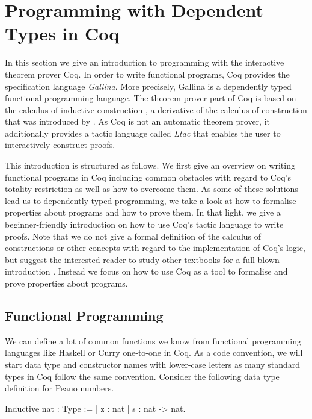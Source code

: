 \section{Programming with Dependent Types in Coq}
\label{sec:progDT}

In this section we give an introduction to programming with the interactive theorem prover Coq.
In order to write functional programs, Coq provides the specification language \emph{Gallina}.
More precisely, Gallina is a dependently typed functional programming language.
The theorem prover part of Coq is based on the calculus of inductive construction \citep{coquand1988inductively}, a derivative of the calculus of construction that was introduced by \citet{coquand1986calculus}.
As Coq is not an automatic theorem prover, it additionally provides a tactic language called \emph{Ltac} that enables the user to interactively construct proofs.

This introduction is structured as follows.
We first give an overview on writing functional programs in Coq including common obstacles with regard to Coq's totality restriction as well as how to overcome them.
As some of these solutions lead us to dependently typed programming, we take a look at how to formalise properties about programs and how to prove them.
In that light, we give a beginner\--friendly introduction on how to use Coq's tactic language to write proofs.
Note that we do not give a formal definition of the calculus of constructions or other concepts with regard to the implementation of Coq's logic, but suggest the interested reader to study other textbooks for a full\--blown introduction \citep{pierce2010software, chlipala2013certified}.
Instead we focus on how to use Coq as a tool to formalise and prove properties about programs.

\subsection{Functional Programming}

We can define a lot of common functions we know from functional programming languages like Haskell or Curry one\--to\--one in Coq.
As a code convention, we will start data type and constructor names with lower\--case letters as many standard types in Coq follow the same convention.
Consider the following data type definition for Peano numbers.

\begin{coqcode}
Inductive nat : Type :=
| z : nat
| s : nat -> nat.
\end{coqcode}

